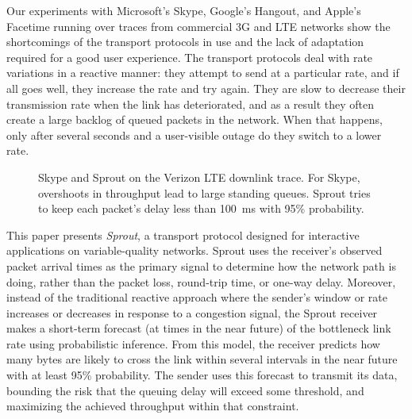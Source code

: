 Our experiments with Microsoft's Skype, Google's Hangout, and Apple's
Facetime running over traces from commercial 3G and LTE networks show
the shortcomings of the transport protocols in use and the lack of
adaptation required for a good user experience.
The transport protocols deal with rate variations in a reactive
manner: they attempt to send at a particular rate, and if all goes
well, they increase the rate and try again. They are slow to
decrease their transmission rate when the link has deteriorated, and as a
result they often create a large backlog of queued packets in the
network. When that happens, only after several seconds and a
user-visible outage do they switch to a lower rate.


\begin{figure}
\caption{Skype and Sprout on the Verizon LTE downlink trace. For Skype, overshoots in throughput lead to large standing queues. Sprout tries to keep each
packet's delay less than 100~ms with 95\% probability.}
\label{fig:skypevssprout}
\vspace{\baselineskip}
\scriptsize\def\svgwidth{\columnwidth}
\end{figure}

This paper presents {\em Sprout}, a transport protocol designed for
interactive applications on variable-quality networks. Sprout uses the
receiver's observed packet arrival times as the primary signal to
determine how the network path is doing, rather than the packet loss,
round-trip time, or one-way delay. Moreover, instead of the
traditional reactive approach where the sender's window or rate
increases or decreases in response to a congestion signal, the Sprout
receiver makes a short-term forecast (at times in the near future) of
the bottleneck link rate using probabilistic inference.  From this
model, the receiver predicts how many bytes are likely to cross the
link within several intervals in the near future with at least 95\%
probability. The sender uses this forecast to transmit its data,
bounding the risk that the queuing delay will exceed some threshold,
and maximizing the achieved throughput within that constraint.


